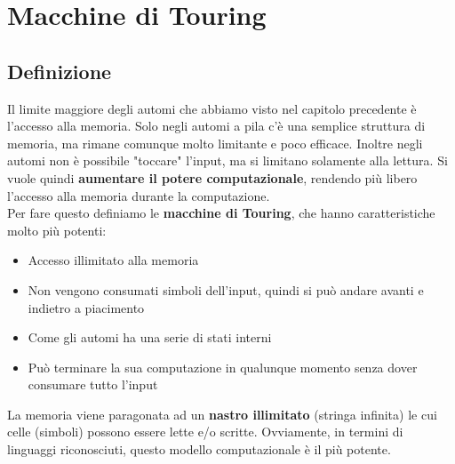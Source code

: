 \chapter{Macchine di Touring}
\section{Definizione}
Il limite maggiore degli automi che abbiamo visto nel capitolo precedente è l'accesso alla memoria.
Solo negli automi a pila c'è una semplice struttura di memoria, ma rimane comunque molto limitante e poco efficace.
Inoltre negli automi non è possibile "toccare" l'input, ma si limitano solamente alla lettura.
Si vuole quindi \textbf{aumentare il potere computazionale}, rendendo più libero l'accesso alla memoria durante la computazione.\\
Per fare questo definiamo le \textbf{macchine di Touring}, che hanno caratteristiche molto più potenti:
\begin{itemize}
    \item Accesso illimitato alla memoria
    \item Non vengono consumati simboli dell'input, quindi si può andare avanti e indietro a piacimento
    \item Come gli automi ha una serie di stati interni
    \item Può terminare la sua computazione in qualunque momento senza dover consumare tutto l'input
\end{itemize} 
La memoria viene paragonata ad un \textbf{nastro illimitato} (stringa infinita) le cui celle (simboli) possono essere lette e/o scritte.
Ovviamente, in termini di linguaggi riconosciuti, questo modello computazionale è il più potente.\smallskip\\
